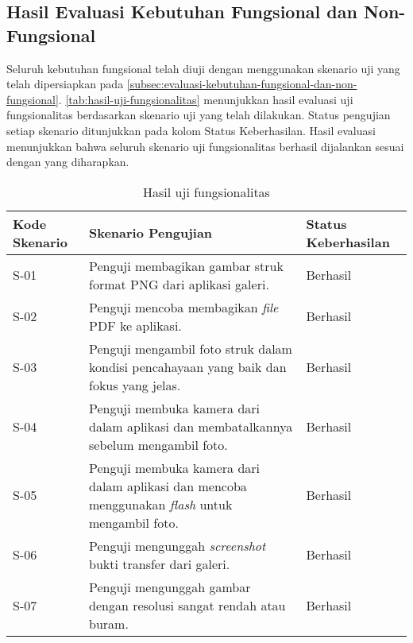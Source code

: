 \subsection{Hasil Evaluasi Kebutuhan Fungsional dan Non-Fungsional}
\label{subsec:hasil-evaluasi-kebutuhan-fungsional-dan-non-fungsional}

Seluruh kebutuhan fungsional telah diuji dengan menggunakan skenario uji yang telah dipersiapkan pada \autoref{subsec:evaluasi-kebutuhan-fungsional-dan-non-fungsional}. \autoref{tab:hasil-uji-fungsionalitas} menunjukkan hasil evaluasi uji fungsionalitas berdasarkan skenario uji yang telah dilakukan. Status pengujian setiap skenario ditunjukkan pada kolom Status Keberhasilan. Hasil evaluasi menunjukkan bahwa seluruh skenario uji fungsionalitas berhasil dijalankan sesuai dengan yang diharapkan.

\begin{table}[h!]
\caption{Hasil uji fungsionalitas}
\label{tab:hasil-uji-fungsionalitas}
\begin{tabularx}{\linewidth}{|p{2cm}|X|p{2.5cm}|}
\hline
\textbf{Kode Skenario} & \textbf{Skenario Pengujian} & \textbf{Status Keberhasilan} \\
\hline
S-01 & Penguji membagikan gambar struk format PNG dari aplikasi galeri. & Berhasil \\
\hline
S-02 & Penguji mencoba membagikan \emph{file} PDF ke aplikasi. & Berhasil \\
\hline
S-03 & Penguji mengambil foto struk dalam kondisi pencahayaan yang baik dan fokus yang jelas. & Berhasil \\
\hline
S-04 & Penguji membuka kamera dari dalam aplikasi dan membatalkannya sebelum mengambil foto. & Berhasil \\
\hline
S-05 & Penguji membuka kamera dari dalam aplikasi dan mencoba menggunakan \emph{flash} untuk mengambil foto. & Berhasil \\
\hline
S-06 & Penguji mengunggah \emph{screenshot} bukti transfer dari galeri. & Berhasil \\
\hline
S-07 & Penguji mengunggah gambar dengan resolusi sangat rendah atau buram. & Berhasil \\
\hline
\end{tabularx}
\end{table}

